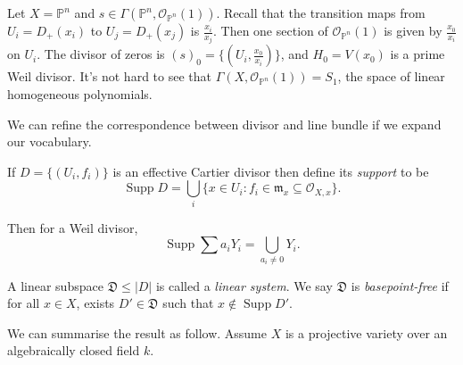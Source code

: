 \documentclass[a4paper]{article}
\renewcommand*{\P}{\mathbb{P}}
\newcommand{\sh}[1]{\mathcal{#1}} %
\DeclareMathOperator{\Supp}{Supp} %
\begin{document}
\begin{eg}
  Let \(X = \P^n\) and \(s \in \Gamma(\P^n, \sh O_{\P^n}(1))\). Recall that the transition maps from \(U_i = D_+(x_i)\) to \(U_j = D_+(x_j)\) is \(\frac{x_i}{x_j}\). Then one section of \(\sh O_{\P^n}(1)\) is given by \(\frac{x_0}{x_i}\) on \(U_i\). The divisor of zeros is \((s)_0 = \{(U_i, \frac{x_0}{x_i})\}\), and \(H_0 = V(x_0)\) is a prime Weil divisor. It's not hard to see that \(\Gamma(X, \sh O_{\P^n}(1)) = S_1\), the space of linear homogeneous polynomials.
\end{eg}

We can refine the correspondence between divisor and line bundle if we expand our vocabulary.

\begin{definition}
  If \(D = \{(U_i, f_i)\}\) is an effective Cartier divisor then define its \emph{support} to be
  \[
    \Supp D = \bigcup_i \{x \in U_i: f_i \in \mathfrak m_x \subseteq \sh O_{X, x}\}.
  \]
\end{definition}
Then for a Weil divisor,
\[
  \Supp \sum a_iY_i = \bigcup_{a_i \neq 0} Y_i.
\]

\begin{definition}
  A linear subspace \(\mathfrak D \leq |D|\) is called a \emph{linear system}. We say \(\mathfrak D\) is \emph{basepoint-free} if for all \(x \in X\), exists \(D' \in \mathfrak D\) such that \(x \notin \Supp D'\).
\end{definition}

We can summarise the result as follow. Assume \(X\) is a projective variety over an algebraically closed field \(k\).
\end{document}
